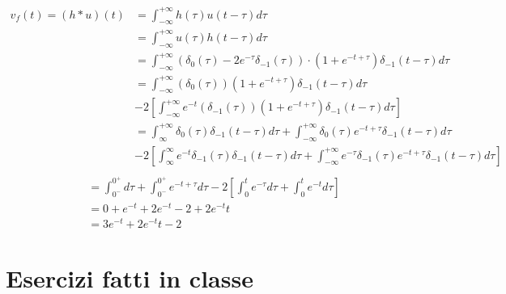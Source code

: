 \documentclass[a4paper]{article}
\begin{document}
\begin{equation*}
    \begin{aligned}
        v_f(t) = (h \ast u)(t) &= \int_{-\infty}^{+\infty}h(\tau)u(t-\tau)d\tau\\
        &= \int_{-\infty}^{+\infty} u(\tau)h(t-\tau)d\tau\\ 
        &= \int_{-\infty}^{+\infty} (\delta_0(\tau) - 2e^{-\tau}\delta_{-1}(\tau)) \cdot (1+e^{-t+\tau})\delta_{-1}(t-\tau) d\tau\\
        &= \int_{-\infty}^{+\infty} (\delta_0(\tau))(1+e^{-t+\tau})\delta_{-1}(t-\tau) d\tau \\
        &-2 \left[\int_{-\infty}^{+\infty}e^{-t}(\delta_{-1}(\tau))(1+e^{-t+\tau})\delta_{-1}(t-\tau)d\tau\right] \\
        &= \int_{\infty}^{+\infty} \delta_0(\tau)\delta_{-1}(t - \tau)d\tau + \int_{-\infty}^{+\infty} \delta_0(\tau)e^{-t+\tau}\delta_{-1}(t-\tau)d\tau\\
        &-2 \left[\int_{\infty}^{\infty} e^{-t}\delta_{-1}(\tau)\delta_{-1}(t-\tau)d\tau + \int_{-\infty}^{+\infty} e^{-\tau}\delta_{-1}(\tau)e^{-t+\tau}\delta_{-1}(t-\tau)d\tau\right]\\
    \end{aligned}
\end{equation*}
\begin{equation*}
    \begin{aligned}
        &= \int_{0^-}^{0^+} d\tau + \int_{0^-}^{0^+} e^{-t+\tau}d\tau  - 2\left[\int_{0}^t e^{-\tau}d\tau + \int_{0}^{t} e^{-t}d\tau\right]\\    
        &= 0 + e^{-t} + 2e^{-t} - 2 + 2e^{-t}t \\
        &= 3e^{-t} + 2e^{-t}t - 2
    \end{aligned}
\end{equation*}









\pagebreak
\section{Esercizi fatti in classe}
\end{document}
